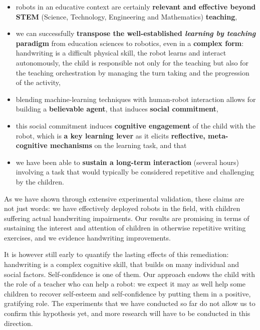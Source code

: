 \documentclass{article}
\begin{document}
\begin{itemize}
    \item robots in an educative context are certainly \textbf{relevant and
        effective beyond STEM} (Science, Technology, Engineering and
        Mathematics) \textbf{teaching},

    \item we can successfully \textbf{transpose the well-established
        \emph{learning by teaching} paradigm} from education sciences to
        robotics, even in a \textbf{complex form}: handwriting is a difficult
        physical skill, the robot learns and interact autonomously, the child is
        responsible not only for the teaching but also for the teaching
        orchestration by managing the turn taking and the progression of the
        activity,

    \item blending machine-learning techniques with human-robot interaction
        allows for building a \textbf{believable agent}, that induces
        \textbf{social commitment},

    \item this social commitment induces \textbf{cognitive engagement}
        of the child with the robot, which is \textbf{a key learning lever} as it
        elicits \textbf{reflective, meta-cognitive mechanisms} on the learning task, and that

    \item we have been able to \textbf{sustain a long-term interaction}
        (several hours) involving a task that would typically be considered 
        repetitive and challenging by the children.


\end{itemize}

As we have shown through extensive experimental validation, these claims are not just
words: we have effectively deployed robots in the field, with children suffering
actual handwriting impairments. Our results are promising in terms of sustaining
the interest and attention of children in otherwise repetitive writing exercises,
and we evidence handwriting improvements.

It is however still early to quantify the lasting effects of this remediation:
handwriting is a complex cognitive skill, that builds on many individual and
social factors. Self-confidence is one of them. Our approach endows the child
with the role of a teacher who can help a robot: we expect it may as well help
some children to recover self-esteem and self-confidence by putting them in a
positive, gratifying role. The experiments that we have conducted so far do not
allow us to confirm this hypothesis yet, and more research will have to be
conducted in this direction.
\end{document}
